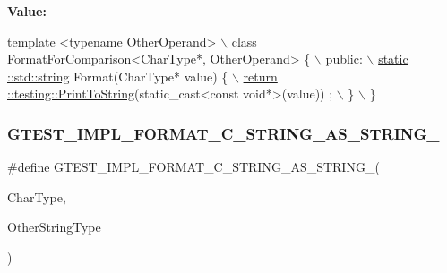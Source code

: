 {\bfseries Value\+:}
\begin{DoxyCode}
\textcolor{keyword}{template} <\textcolor{keyword}{typename} OtherOperand>                                      \(\backslash\)
  class FormatForComparison<CharType*, OtherOperand> \{                  \(\backslash\)
   public:                                                              \hyperlink{namespacetesting_1_1internal_a8e8ff5b11e64078831112677156cb111}{\(\backslash\)}
\hyperlink{namespacetesting_1_1internal_a8e8ff5b11e64078831112677156cb111}{    static ::std::string} Format(CharType* value) \{                      
      \hyperlink{namespacetesting_aa5717bb1144edd1d262d310ba70c82ed}{\(\backslash\)}
\hyperlink{namespacetesting_aa5717bb1144edd1d262d310ba70c82ed}{      return ::testing::PrintToString}(static\_cast<const void*>(value))
      ; \(\backslash\)
    \}                                                                   \(\backslash\)
  \}
\end{DoxyCode}
\mbox{\label{gtest-printers_8h_ad6102ed2a0571d5196e606a061c16a10}} 
\subsubsection{\texorpdfstring{G\+T\+E\+S\+T\+\_\+\+I\+M\+P\+L\+\_\+\+F\+O\+R\+M\+A\+T\+\_\+\+C\+\_\+\+S\+T\+R\+I\+N\+G\+\_\+\+A\+S\+\_\+\+S\+T\+R\+I\+N\+G\+\_\+}{GTEST\_IMPL\_FORMAT\_C\_STRING\_AS\_STRING\_}}
{\footnotesize\ttfamily \#define G\+T\+E\+S\+T\+\_\+\+I\+M\+P\+L\+\_\+\+F\+O\+R\+M\+A\+T\+\_\+\+C\+\_\+\+S\+T\+R\+I\+N\+G\+\_\+\+A\+S\+\_\+\+S\+T\+R\+I\+N\+G\+\_\+(\begin{DoxyParamCaption}\item[{}]{Char\+Type,  }\item[{}]{Other\+String\+Type }\end{DoxyParamCaption})}

